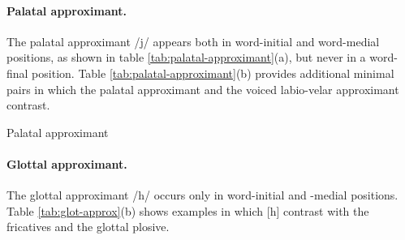 \paragraph{Palatal approximant.}
The palatal approximant /{\sls j}/  appears both in word-initial and word-medial
positions, as shown in table  \ref{tab:palatal-approximant}(a),   but never in a
word-final position.   Table
\ref{tab:palatal-approximant}(b) provides additional minimal pairs in which the
palatal approximant and the voiced labio-velar approximant contrast.


\begin{table}[!htb] \small
\centering
\caption{Palatal approximant\label{tab:palatal-approximant}}
\quad
{}


\end{table}



\paragraph{Glottal approximant.}
\label{sec:glot-approx}

The glottal approximant   /{\sls h}/  
occurs only in word-initial and -medial positions.
Table \ref{tab:glot-approx}(b) shows examples in which [{\sls h}]
contrast with the fricatives and the glottal plosive.


